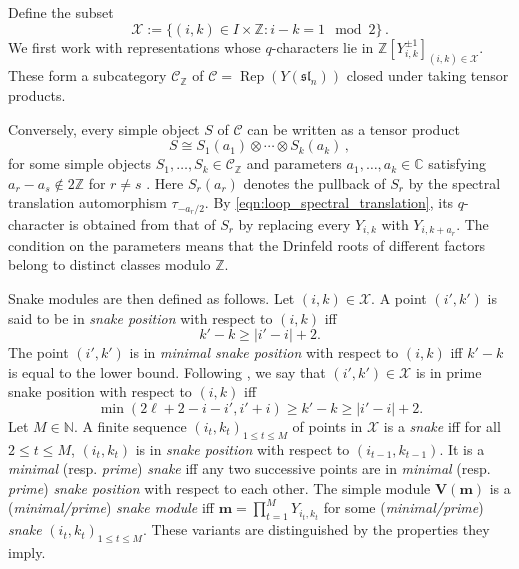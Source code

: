 \documentclass[12pt,reqno]{amsart}
\newcommand{\C}{{\mathbb C}}
\newcommand{\Z}{{\mathbb Z}}
\numberwithin{equation}{section}
\begin{document}
Define the {subset} $$\mathcal{X}:=\{(i,k)\in I\times\mathbb{Z}:i-k=1\mod 2\}\,.$$%
We first work with representations whose $q$-characters lie in
$\Z[Y_{i,k}^{\pm1}]_{(i,k)\in\mathcal X}$. These form a subcategory
$\mathcal C_{\Z}$ of
$\mathcal C=\operatorname{Rep}(Y(\mathfrak{sl}_n))$
closed under taking tensor products.

Conversely, every simple object $S$ of $\mathcal C$ can be written
as a tensor product
\begin{equation*}
	S \cong S_1(a_1)\otimes\cdots\otimes S_k(a_k)\,,
\end{equation*}
for some simple objects $S_1,\ldots,S_k\in\mathcal C_{\Z}$ and
parameters $a_1,\ldots,a_k\in\C$ satisfying
$a_r-a_s\notin2\Z$ for $r\neq s$ \cite{CPBook,C2002}.
Here $S_r(a_r)$ denotes the pullback of $S_r$ by the spectral
translation automorphism $\tau_{-a_r/2}$. By
\eqref{eqn:loop_spectral_translation}, its $q$-character is obtained
from that of $S_r$ by replacing every $Y_{i,k}$ with $Y_{i,k+a_r}$.
The condition on the parameters means that the Drinfeld roots
of different factors belong to distinct classes modulo $\Z$.

{Snake modules} are then defined as follows.
Let $(i,k)\in\mathcal{X}$. A point $(i',k')$ is said to be in {\textit{snake position}} with respect to $(i,k)$ iff
\begin{equation}
	k'-k \geq |i'-i|+2.\label{eqn:snake_pos}
\end{equation}
The point $(i',k')$ is in \textit{minimal snake position} with respect to $(i,k)$ iff $k'-k$ is equal to the {lower bound}.
Following \cite[Section~3.2]{DuanLiLuo2019}, we say that $(i',k')\in\mathcal{X}$ is in {prime snake position} with respect to $(i,k)$ iff
\begin{equation}
	\min(2\ell+2-i-i',i'+i)\geq k'-k \geq |i'-i|+2.\label{eqn:prime_snake_pos}
\end{equation}
Let $M\in\mathbb{N}$. A finite sequence $(i_t,k_t)_{1\leq t\leq M}$ of points in $\mathcal{X}$ is a {\textit{snake}} iff for all $2\leq t\leq M$, $(i_t,k_t)$ is in \textit{snake position} with respect to $(i_{t-1},k_{t-1})$.
It is a {\textit{minimal}} (resp. {\textit{prime}}) {\textit{snake}} iff any two successive points are in \textit{minimal} (resp. \textit{prime}) \textit{snake position} with respect to each other.
The simple module $\boldsymbol{V(m)}$ is a ({\textit{minimal/prime}}) \textit{{snake module}} iff $\boldsymbol{m} = \prod_{t=1}^{M}Y_{i_t,k_t}$ for some (\textit{minimal/prime}) \textit{snake} $(i_t,k_t)_{1\leq t\leq M}$. These variants are distinguished by the properties they imply.
\end{document}
